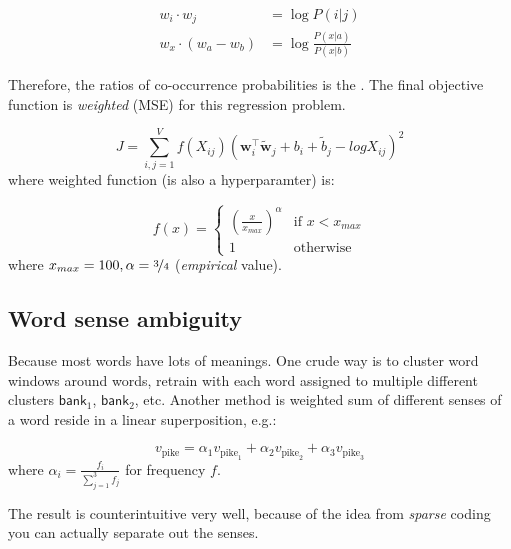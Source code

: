 
\begin{align}
w_i \cdot w_j &= \log P(i|j) \\
w_x \cdot (w_a - w_b) &= \log \frac{P(x|a)}{P(x|b)}
\end{align}

Therefore, the ratios of co-occurrence probabilities is the .
The final objective function is \emph{weighted}  (MSE) for this regression problem.

\begin{equation}
	J = \sum_{i,j=1}^V f(X_{ij})\left(\bm{w}_i^\top \tilde{\bm{w}}_j + b_i + \tilde{b}_j - 
	log X_{ij}\right)^2
\end{equation}
where weighted function (is also a hyperparamter) is:

\begin{equation}
f(x) =
\begin{cases}
	\left(\frac{x}{x_{max}}\right)^\alpha & \text{if } x < x_{max} \\
	1 & \text{otherwise}
\end{cases}
\end{equation}
where $x_{max} = 100, \alpha = \nicefrac{3}{4}$ (\emph{empirical} value). 

\subsection{Word sense ambiguity}
Because most words have lots of meanings.
One crude way  is to cluster word windows around words, retrain with each
word assigned to multiple different clusters $\textsf{bank}_1$, $\textsf{bank}_2$, etc.
Another method  is weighted sum of different senses of a word reside in a linear superposition, e.g.:

\begin{equation}
v_{\text{pike}} = \alpha_1 v_{\text{pike}_1} + \alpha_2 v_{\text{pike}_2} + \alpha_3 v_{\text{pike}_3}
\end{equation}
where $\alpha_i = \frac{f_i}{\sum_{j=1}^3 f_j}$ for frequency $f$.

The result is counterintuitive very well, because of the idea from \emph{sparse} coding you can actually separate out the senses.

